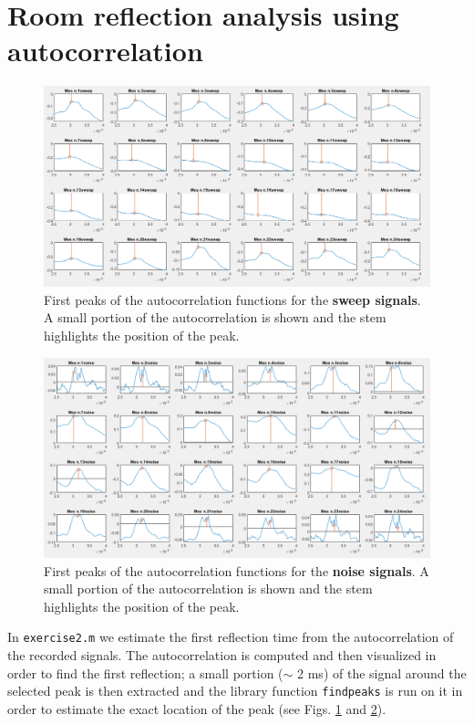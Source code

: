 \documentclass[a4paper]{article}
\begin{document}
\section{Room reflection analysis using autocorrelation}
\begin{figure}[h]
	\centering
	\includegraphics[width=0.85\linewidth]{sweep_peaks.png}
	\caption{First peaks of the autocorrelation functions for the \textbf{sweep signals}. A small portion of the autocorrelation is shown and the stem highlights the position of the peak.}
	\label{fig:sweepcorr}
\end{figure}

\begin{figure}[h]
	\centering
	\includegraphics[width=0.85\linewidth]{noise_peaks.png}
	\caption{First peaks of the autocorrelation functions for the \textbf{noise signals}. A small portion of the autocorrelation is shown and the stem highlights the position of the peak.}
	\label{fig:noisecorr}
\end{figure}


In \verb|exercise2.m| we estimate the first reflection time from the autocorrelation of the recorded signals. The autocorrelation is computed and then visualized in order to find the first reflection; a small portion ($\sim$ 2 ms) of the signal around the selected peak is then extracted and the library function \verb|findpeaks| is run on it in order to estimate the exact location of the peak (see Figs. \ref{fig:sweepcorr} and \ref{fig:noisecorr}).
\end{document}
